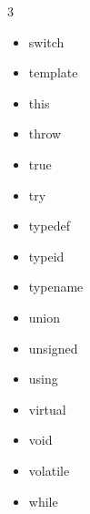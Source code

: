 \documentclass[10pt]{article}
\begin{document}
\begin{multicols}{3}
\begin{itemize}
    \item switch
    \item template
    \item this
    \item throw
    \item true
    \item try
    \item typedef
    \item typeid
    \item typename
    \item union
    \item unsigned
    \item using
    \item virtual
    \item void
    \item volatile
    \item while
\end{itemize}
\end{multicols}

\newpage
\end{document}
